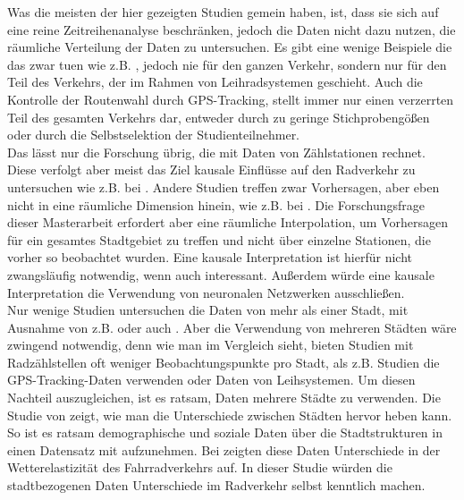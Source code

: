 \documentclass[a4paper,12pt]{thesis}
\begin{document}
Was die meisten der hier gezeigten Studien gemein haben, ist, dass sie sich auf eine reine Zeitreihenanalyse beschränken, jedoch die Daten nicht dazu nutzen, die räumliche Verteilung der Daten zu untersuchen. Es gibt eine wenige Beispiele die das zwar tuen wie z.B. \cite{Alattar2021}, jedoch nie für den ganzen Verkehr, sondern nur für den Teil des Verkehrs, der im Rahmen von Leihradsystemen geschieht. Auch die Kontrolle der Routenwahl durch GPS-Tracking, stellt immer nur einen verzerrten Teil des gesamten Verkehrs dar, entweder durch zu geringe Stichprobengößen oder durch die Selbstselektion der Studienteilnehmer.\\
Das lässt nur die Forschung übrig, die mit Daten von Zählstationen rechnet. Diese verfolgt aber meist das Ziel kausale Einflüsse auf den Radverkehr zu untersuchen wie z.B. bei \cite{Wessel2020}. Andere Studien treffen zwar Vorhersagen, aber eben nicht in eine räumliche Dimension hinein, wie z.B. bei \cite{Holmgren2017}. Die Forschungsfrage dieser Masterarbeit erfordert aber eine räumliche Interpolation, um Vorhersagen für ein gesamtes Stadtgebiet zu treffen und nicht über einzelne Stationen, die vorher so beobachtet wurden. Eine kausale Interpretation ist hierfür nicht zwangsläufig notwendig, wenn auch interessant. Außerdem würde eine kausale Interpretation die Verwendung von neuronalen Netzwerken ausschließen.\\
Nur wenige Studien untersuchen die Daten von mehr als einer Stadt, mit Ausnahme von z.B. \cite{Wessel2020} oder auch \cite{Li2022}. Aber die Verwendung von mehreren Städten wäre zwingend notwendig, denn wie man im Vergleich sieht, bieten Studien mit Radzählstellen oft weniger Beobachtungspunkte pro Stadt, als z.B. Studien die GPS-Tracking-Daten verwenden oder Daten von Leihsystemen. Um diesen Nachteil auszugleichen, ist es ratsam, Daten mehrere Städte zu verwenden. Die Studie von \cite{Goldmann2021} zeigt, wie man die Unterschiede zwischen Städten hervor heben kann. So ist es ratsam demographische und soziale Daten über die Stadtstrukturen in einen Datensatz mit aufzunehmen. Bei \cite{Goldmann2021} zeigten diese Daten Unterschiede in der Wetterelastizität des Fahrradverkehrs auf. In dieser Studie würden die stadtbezogenen Daten Unterschiede im Radverkehr selbst kenntlich machen.\\
\end{document}
